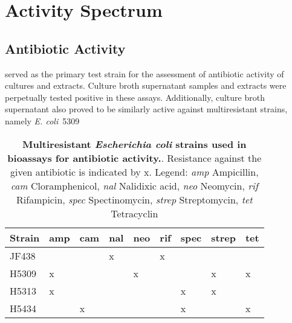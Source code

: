 


\section{Activity Spectrum} %
\label{sec:activity_spectrum}


\subsection{Antibiotic Activity} %
\label{sub:antibiotic_activity}

\coli{} served as the primary test strain for the assessment of antibiotic activity of \tue{} cultures and extracts.
Culture broth supernatant samples and extracts were perpetually tested positive in these assays.
Additionally, culture broth supernatant also proved to be similarly active against multiresistant strains, namely \emph{E. coli}~5309 

\begin{table}[htbp]
\caption[Multiresistant \emph{Escherichia coli} strains used in bioassays for antibiotic activity.]{%
	\textbf{Multiresistant \emph{Escherichia coli} strains used in bioassays for antibiotic activity.}.
    Resistance against the given antibiotic is indicated by x.
    Legend:
    \emph{amp} Ampicillin,
    \emph{cam} Cloramphenicol,
    \emph{nal} Nalidixic acid,
    \emph{neo} Neomycin,
    \emph{rif} Rifampicin,
    \emph{spec} Spectinomycin,
    \emph{strep} Streptomycin,
    \emph{tet} Tetracyclin
}
\label{tab:resistant_colis}
\centering
\begin{tabularx}{\textwidth}{XXXXXXXXX}
    \toprule
    Strain 	& amp 	& cam 	& nal 	& neo 	& rif 	& spec 	& strep 	& tet 	\\
    \midrule
    JF438 	&		&		& x		&		& x		& 		&			&		\\
    H5309	& x		& 		&		& x		&		&		& x			& x		\\
    H5313 	& x		&		&		&		&		& x		& x			&  		\\
    H5434 	& 		& x		& 		&		&		& x		&			& x 	\\
    \bottomrule
\end{tabularx}
\end{table}


